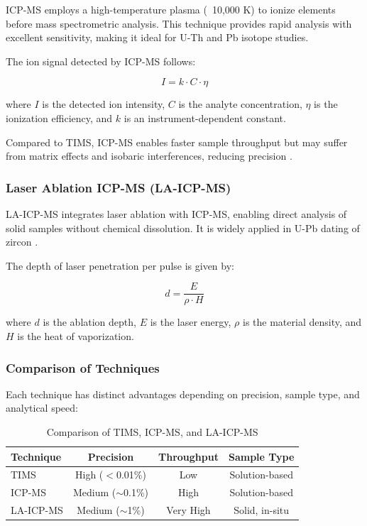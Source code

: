 \documentclass{article}
\begin{document}
ICP-MS employs a high-temperature plasma (~10,000 K) to ionize elements before mass spectrometric analysis. This technique provides rapid analysis with excellent sensitivity, making it ideal for U-Th and Pb isotope studies.

The ion signal detected by ICP-MS follows:

\begin{equation}
I = k \cdot C \cdot \eta
\end{equation}

where \( I \) is the detected ion intensity, \( C \) is the analyte concentration, \( \eta \) is the ionization efficiency, and \( k \) is an instrument-dependent constant.

Compared to TIMS, ICP-MS enables faster sample throughput but may suffer from matrix effects and isobaric interferences, reducing precision \cite{Koornneef2014ICPMS}.



\subsubsection*{Laser Ablation ICP-MS (LA-ICP-MS)}

LA-ICP-MS integrates laser ablation with ICP-MS, enabling direct analysis of solid samples without chemical dissolution. It is widely applied in U-Pb dating of zircon \cite{Frei2009LAICPMS}.

The depth of laser penetration per pulse is given by:

\begin{equation}
d = \frac{E}{\rho \cdot H}
\end{equation}

where \( d \) is the ablation depth, \( E \) is the laser energy, \( \rho \) is the material density, and \( H \) is the heat of vaporization.


\subsubsection*{Comparison of Techniques}

Each technique has distinct advantages depending on precision, sample type, and analytical speed:

\begin{table}[htbp]
    \centering
    \caption{Comparison of TIMS, ICP-MS, and LA-ICP-MS}
    \label{tab:comparison}
    \begin{tabular}{lccc}
        \hline
        \textbf{Technique} & \textbf{Precision} & \textbf{Throughput} & \textbf{Sample Type} \\
        \hline
        TIMS & High ($<$0.01\%) & Low & Solution-based \\
        ICP-MS & Medium ($\sim$0.1\%) & High & Solution-based \\
        LA-ICP-MS & Medium ($\sim$1\%) & Very High & Solid, in-situ \\
        \hline
    \end{tabular}
\end{table}
\end{document}
